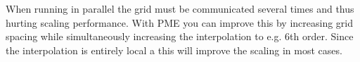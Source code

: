 When running in parallel the grid must be communicated several times
and thus hurting scaling performance. With PME you can improve this
by increasing grid spacing while simultaneously increasing the
interpolation to e.g. 6th order. 
Since the interpolation is entirely local a this will
improve the scaling in most cases.

%
%
%
